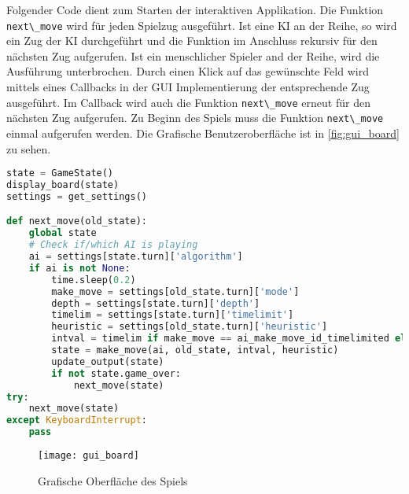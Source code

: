 Folgender Code dient zum Starten der interaktiven Applikation. Die
Funktion \passthrough{\lstinline!next\_move!} wird für jeden Spielzug
ausgeführt. Ist eine KI an der Reihe, so wird ein Zug der KI
durchgeführt und die Funktion im Anschluss rekursiv für den nächsten Zug
aufgerufen. Ist ein menschlicher Spieler and der Reihe, wird die
Ausführung unterbrochen. Durch einen Klick auf das gewünschte Feld wird
mittels eines Callbacks in der GUI Implementierung der entsprechende Zug
ausgeführt. Im Callback wird auch die Funktion
\passthrough{\lstinline!next\_move!} erneut für den nächsten Zug
aufgerufen. Zu Beginn des Spiels muss die Funktion
\passthrough{\lstinline!next\_move!} einmal aufgerufen werden. Die
Grafische Benutzeroberfläche ist in \autoref{fig:gui_board} zu sehen.

\begin{lstlisting}[language=Python]
state = GameState()
display_board(state)
settings = get_settings()

def next_move(old_state):
    global state
    # Check if/which AI is playing
    ai = settings[state.turn]['algorithm']
    if ai is not None:
        time.sleep(0.2)
        make_move = settings[old_state.turn]['mode']
        depth = settings[state.turn]['depth']
        timelim = settings[state.turn]['timelimit']
        heuristic = settings[old_state.turn]['heuristic']
        intval = timelim if make_move == ai_make_move_id_timelimited else depth
        state = make_move(ai, old_state, intval, heuristic)
        update_output(state)
        if not state.game_over:
            next_move(state)
try:
    next_move(state)
except KeyboardInterrupt:
    pass
\end{lstlisting}

\begin{figure}[h]
    \centering
    \texttt{[image: gui\_board]}
    \caption{Grafische Oberfläche des Spiels}
    \label{fig:gui_board}
\end{figure}
